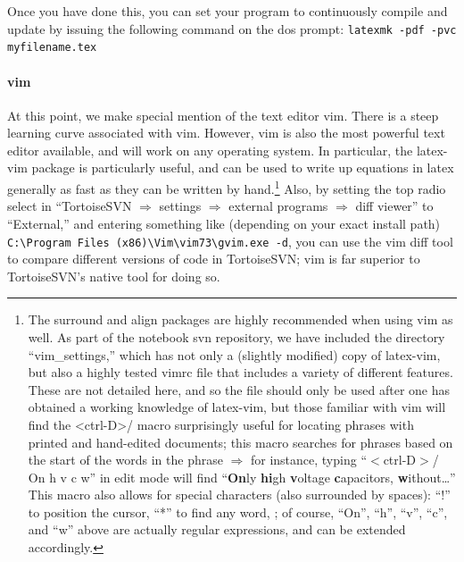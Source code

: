 Once you have done this, you can set
    your program to continuously compile and update
    by issuing the following command on the dos prompt:
    \verb|latexmk -pdf -pvc myfilename.tex|
\paragraph{vim}
At this point, we make special mention of
    the text editor vim.
There is a steep learning curve associated with vim.
However, vim is also the most powerful text editor available,
    and will work on any operating system.
In particular, the latex-vim package is particularly useful,
    and can be used to write up equations in latex generally
    as fast as they can be written by hand.\footnote{The surround and align packages  are highly recommended when using vim as well.
    As part of the notebook svn repository, we have included
        the directory ``vim\_settings,'' which has not only
        a (slightly modified) copy of latex-vim, but also a highly
        tested vimrc file that includes a variety of different features.
    These are not detailed here, and so the file should only be used
        after one has obtained a working knowledge of latex-vim,
        but those familiar with vim will find the <ctrl-D>/ macro
        surprisingly useful for locating phrases with
        printed and hand-edited documents;
        this macro searches for phrases
        based on the start of the words in the phrase $\Rightarrow$
        for instance, typing ``$<$ctrl-D$>$/ On h v c w''
        in edit mode will find ``{\bf On}ly {\bf hi}gh {\bf v}oltage {\bf c}apacitors, {\bf w}ithout\ldots''
    This macro also allows for special characters (also surrounded by spaces):
    ``!'' to position the cursor, ``*'' to find any word, ;
        of course,
        ``On'', ``h'', ``v'', ``c'', and ``w'' above are actually
        regular expressions, and can be extended accordingly.}
Also, by setting the top radio select in
    ``TortoiseSVN $\Rightarrow$ settings $\Rightarrow$ external programs $\Rightarrow$ diff viewer''
    to ``External,'' and entering something like (depending on your exact install path)
    \verb|C:\Program Files (x86)\Vim\vim73\gvim.exe -d|,
    you can use the vim diff tool to compare different versions of code
    in TortoiseSVN;
    vim is far superior to TortoiseSVN's native tool for doing so.
